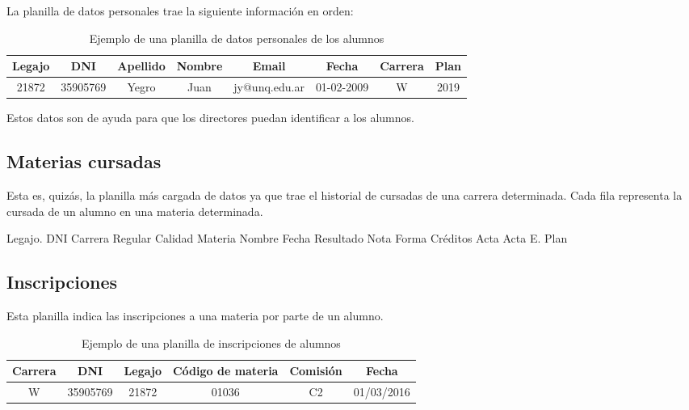 La planilla de datos personales trae la siguiente información en orden: 

\begin{table}[!htbp]
    \centering
    \begin{tabular}{|c|c|c|c|c|c|c|c|}
    \hline
    Legajo & DNI & Apellido & Nombre & Email & Fecha & Carrera & Plan \\ \hline
    21872 & 35905769 & Yegro & Juan & jy@unq.edu.ar & 01-02-2009 & W & 2019 \\
    \hline
    \end{tabular}
    \caption{Ejemplo de una planilla de datos personales de los alumnos}
    \label{tab:tabla_datos}
\end{table}

Estos datos son de ayuda para que los directores puedan identificar a los alumnos.

\subsection[Materias cursadas]{Materias cursadas}

Esta es, quizás, la planilla más cargada de datos ya que trae el historial de cursadas de una carrera determinada. Cada fila representa la cursada de un alumno en una materia determinada.


\begin{outline}
    \2 Legajo.
    \2 DNI 
    \2 Carrera 
    \2 Regular 
    \2 Calidad 
    \2 Materia 
    \2 Nombre 
    \2 Fecha 
    \2 Resultado 
    \2 Nota 
    \2 Forma 
    \2 Créditos
    \2 Acta 
    \2 Acta E. 
    \2 Plan
\end{outline}

\subsection[Inscripciones]{Inscripciones}

Esta planilla indica las inscripciones a una materia por parte de un alumno.

\begin{table}[!htbp]
    \centering
    \makegapedcells
    \begin{tabular}{|c|c|c|c|c|c|}
    \hline
    Carrera & DNI & Legajo & Código de materia & Comisión & Fecha  \\\hline
    W & 35905769 & 21872 & 01036 & C2 & 01/03/2016  \\
    \hline
    \end{tabular}
    \caption{Ejemplo de una planilla de inscripciones de alumnos}
    \label{tab:tabla_datos}
\end{table}


